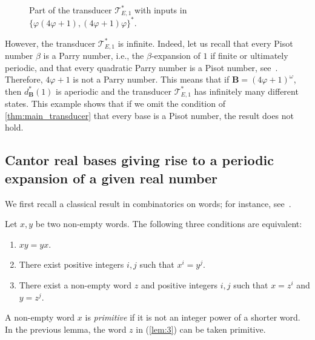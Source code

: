 \documentclass[12pt,reqno]{amsart}
\newcommand{\B}{{\mathbf{B}}}
\begin{document}
\begin{example}
\begin{figure}[ht]
\begin{center}
\begin{tikzpicture}[->,thick,main node/.style={circle,draw,minimum size=12pt,inner sep=2pt}]
\end{tikzpicture}
\end{center}
\caption{Part of the transducer $\mathcal{T}_{E,1}^*$ with inputs in $\{\varphi(4\varphi+1),(4\varphi+1)\varphi\}^*$.}
\label{fig:sub-transducer-alternate}
\end{figure}
    
However, the transducer $\mathcal{T}_{E,1}^*$ is infinite. Indeed, let us recall that every Pisot number $\beta$ is a Parry number, i.e., the $\beta$-expansion of $1$ if finite or ultimately periodic, and that every quadratic Parry number is a Pisot number, see~\cite{Bassino02}. 
Therefore, $4\varphi+1$ is not a Parry number. This means that if $\B=(4\varphi+1)^\omega$, then $d^*_{\B}(1)$ is aperiodic and the transducer $\mathcal{T}_{E,1}^*$ has infinitely many different states. This example shows that if we omit the condition of \cref{thm:main_transducer} that every base is a Pisot number, the result does not hold. 
\end{example}



\subsection{Cantor real bases giving rise to a periodic expansion of a given real number}

We first recall a classical result in combinatorics on words; for instance, see~\cite[Thm.~1.5.3]{AS03}. 

\begin{lemma} \label{lem:LS}
    Let $x,y$ be two non-empty words. The following three conditions are equivalent: 
    \begin{enumerate}
        \item $xy=yx$. 
        \item There exist positive integers $i,j$ such that $x^i=y^j$. 
        \item \label{lem:3} There exist a non-empty word $z$ and positive integers $i,j$ such that $x=z^i$ and $y=z^j$. 
    \end{enumerate}
\end{lemma}

A non-empty word $x$ is \emph{primitive} if it is not an integer power of a shorter word. In the previous lemma, the word $z$ in (\ref{lem:3}) can be taken primitive. 
\end{document}
